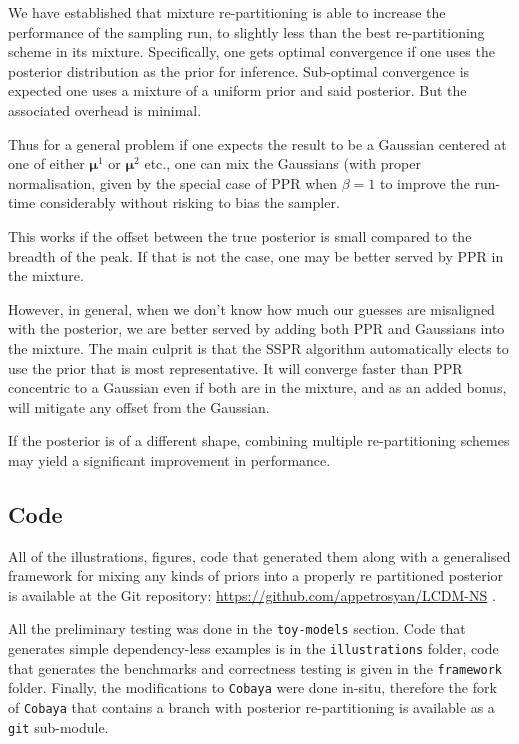 \documentclass[usenatbib]{mnras}
\begin{document}
We have established that mixture re-partitioning is able to
increase the performance of the sampling run, to slightly less than
the best re-partitioning scheme in its mixture. Specifically, one
gets optimal convergence if one uses the posterior distribution as
the prior for inference. Sub-optimal convergence is expected one
uses a mixture of a uniform prior and said posterior. But the
associated overhead is minimal.

Thus for a general problem if one expects the result to be a
Gaussian centered at one of either \(\bm{\mu}^{1}\) or \(\bm{\mu}^{2}\) etc.,
one can mix the Gaussians (with proper normalisation, given by the
special case of PPR when \(\beta=1\) to improve the run-time
considerably without risking to bias the sampler.

This works if the offset between the true posterior is small
compared to the breadth of the peak. If that is not the case, one
may be better served by PPR in the mixture.

However, in general, when we don't know how much our guesses are
misaligned with the posterior, we are better served by adding both
PPR and Gaussians into the mixture. The main culprit is that the
SSPR algorithm automatically elects to use the prior that is most
representative. It will converge faster than PPR concentric to a
Gaussian even if both are in the mixture, and as an added bonus,
will mitigate any offset from the Gaussian.

If the posterior is of a different shape, combining multiple
re-partitioning schemes may yield a significant improvement in
performance.
\subsection{Code}
\label{sec:org9cda059}

All of the illustrations, figures, code that generated them along
with a generalised framework for mixing any kinds of priors into a
properly re partitioned posterior is available at the Git
repository: \url{https://github.com/appetrosyan/LCDM-NS} \cite{sspr}.

All the preliminary testing was done in the \texttt{toy-models}
section. Code that generates simple dependency-less examples is in
the \texttt{illustrations} folder, code that generates the benchmarks and
correctness testing is given in the \texttt{framework} folder. Finally,
the modifications to \texttt{Cobaya} were done in-situ, therefore the fork
of \texttt{Cobaya} that contains a branch with posterior re-partitioning is
available as a \texttt{git} sub-module.
\end{document}
